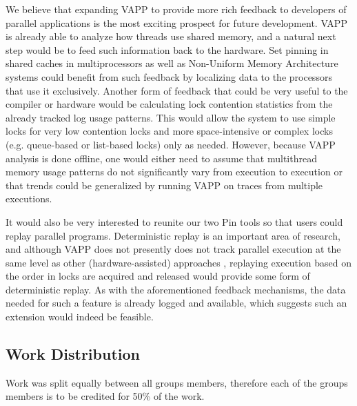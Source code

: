 We believe that expanding VAPP to provide more rich feedback to
developers of parallel applications is the most exciting prospect
for future development.  VAPP is already able to analyze how
threads use shared memory, and a natural next step would be to
feed such information back to the hardware.  Set pinning in
shared caches in multiprocessors as well as Non-Uniform Memory Architecture
systems could benefit from such feedback by localizing data
to the processors that use it exclusively.  Another form of feedback
that could be very useful to the compiler or hardware would be calculating
lock contention statistics from the already tracked log usage patterns.
This would allow the system to use simple locks for very low contention
locks and more space-intensive or complex locks (e.g. queue-based 
or list-based locks) only as needed.  However, because VAPP analysis
is done offline, one would either need to assume that multithread
memory usage patterns do not significantly vary from execution to
execution or that trends could be generalized by running VAPP on
traces from multiple executions.

It would also be very interested to reunite our two Pin tools
so that users could replay parallel programs.  Deterministic
replay is an important area of research, and although VAPP does not
presently does not track parallel execution at the same level as
other (hardware-assisted) approaches \cite{narayansamy2005bugnet},
replaying execution based on the order in locks are acquired and
released would provide some form of deterministic replay.  As with
the aforementioned feedback mechanisms, the data needed for such a
feature is already logged and available, which suggests such an
extension would indeed be feasible.

\subsection{Work Distribution}
Work was split equally between all groups members, therefore each of
the groups members is to be credited for 50\% of the work.
